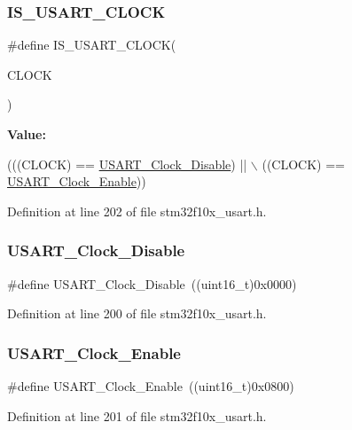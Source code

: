 \subsubsection{\texorpdfstring{I\+S\+\_\+\+U\+S\+A\+R\+T\+\_\+\+C\+L\+O\+CK}{IS\_USART\_CLOCK}}
{\footnotesize\ttfamily \#define I\+S\+\_\+\+U\+S\+A\+R\+T\+\_\+\+C\+L\+O\+CK(\begin{DoxyParamCaption}\item[{}]{C\+L\+O\+CK }\end{DoxyParamCaption})}

{\bfseries Value\+:}
\begin{DoxyCode}
(((CLOCK) == \hyperlink{group___u_s_a_r_t___clock_ga56c12b81d19853c093e0a373d0c52fb5}{USART\_Clock\_Disable}) || \(\backslash\)
                               ((CLOCK) == \hyperlink{group___u_s_a_r_t___clock_gacfe029e2ec4f49ddde031fd031654caa}{USART\_Clock\_Enable}))
\end{DoxyCode}


Definition at line 202 of file stm32f10x\+\_\+usart.\+h.

\mbox{\label{group___u_s_a_r_t___clock_ga56c12b81d19853c093e0a373d0c52fb5}} 
\subsubsection{\texorpdfstring{U\+S\+A\+R\+T\+\_\+\+Clock\+\_\+\+Disable}{USART\_Clock\_Disable}}
{\footnotesize\ttfamily \#define U\+S\+A\+R\+T\+\_\+\+Clock\+\_\+\+Disable~((uint16\+\_\+t)0x0000)}



Definition at line 200 of file stm32f10x\+\_\+usart.\+h.

\mbox{\label{group___u_s_a_r_t___clock_gacfe029e2ec4f49ddde031fd031654caa}} 
\subsubsection{\texorpdfstring{U\+S\+A\+R\+T\+\_\+\+Clock\+\_\+\+Enable}{USART\_Clock\_Enable}}
{\footnotesize\ttfamily \#define U\+S\+A\+R\+T\+\_\+\+Clock\+\_\+\+Enable~((uint16\+\_\+t)0x0800)}



Definition at line 201 of file stm32f10x\+\_\+usart.\+h.

